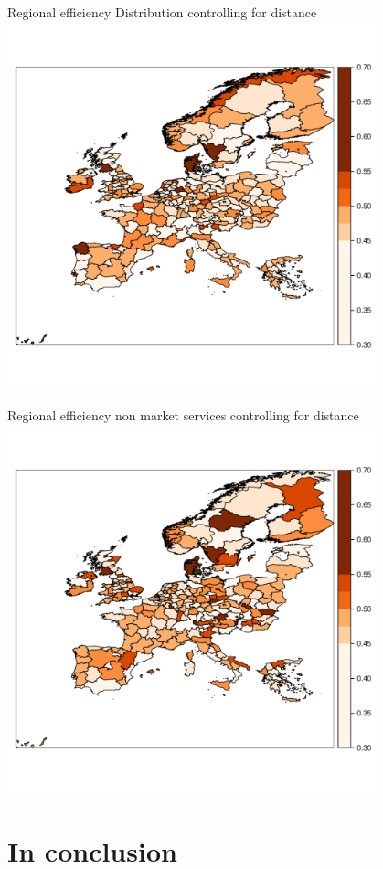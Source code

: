 \documentclass[ignorenonframetext]{beamer}
\begin{document}
\begin{frame}{Regional efficiency Distribution controlling for distance}
\includegraphics[width=0.8\textwidth]{TEfrontierDist}
\end{frame}

\begin{frame}{Regional efficiency non market services controlling for distance}
\includegraphics[width=0.8\textwidth]{TEfrontierNMServ}
\end{frame}

\section{In conclusion}
\end{document}

